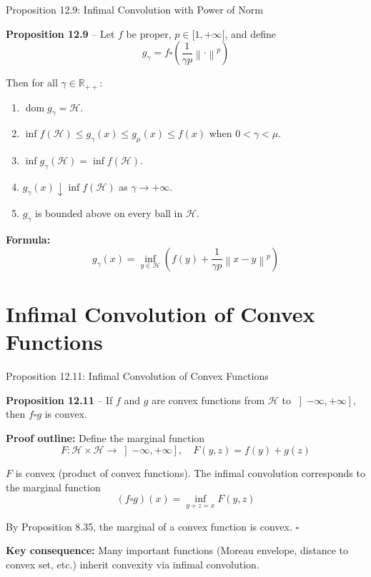 \documentclass[aspectratio=169,10pt]{beamer}
\newcommand{\cH}{\mathcal{H}}
\newcommand{\R}{\mathbb{R}}
\newcommand{\norm}[1]{\left\|#1\right\|}
\newcommand{\dom}{\operatorname{dom}}
\newcommand{\co}{\square}
\begin{document}
\begin{frame}{Proposition 12.9: Infimal Convolution with Power of Norm}

  \textbf{Proposition 12.9} -- Let $f$ be proper, $p \in [1, +\infty[$, and define
  \[
    g_\gamma = f \co \left( \frac{1}{\gamma p} \norm{\cdot}^p \right)
  \]

  Then for all $\gamma \in \R_{++}$:

  \begin{enumerate}
    \item[(i)] $\dom g_\gamma = \cH$.
    \item[(ii)] $\inf f(\cH) \le g_\gamma(x) \le g_\mu(x) \le f(x)$ when $0 < \gamma < \mu$.
    \item[(iii)] $\inf g_\gamma(\cH) = \inf f(\cH)$.
    \item[(iv)] $g_\gamma(x) \downarrow \inf f(\cH)$ as $\gamma \to +\infty$.
    \item[(v)] $g_\gamma$ is bounded above on every ball in $\cH$.
  \end{enumerate}

  \vspace{0.5cm}

  \textbf{Formula:}
  \[
    g_\gamma(x) = \inf_{y \in \cH} \left( f(y) + \frac{1}{\gamma p} \norm{x - y}^p \right)
  \]

\end{frame}

\section{Infimal Convolution of Convex Functions}

\begin{frame}{Proposition 12.11: Infimal Convolution of Convex Functions}

  \textbf{Proposition 12.11} -- If $f$ and $g$ are convex functions from
  $\cH$ to $\left]-\infty, +\infty\right]$, then $f \co g$ is convex.

  \vspace{1cm}

  \textbf{Proof outline:} Define the marginal function
  \[
    F: \cH \times \cH \to \left]-\infty, +\infty\right], \quad F(y,z) = f(y) + g(z)
  \]

  $F$ is convex (product of convex functions). The infimal convolution
  corresponds to the marginal function
  \[
    (f \co g)(x) = \inf_{y+z=x} F(y,z)
  \]

  By Proposition 8.35, the marginal of a convex function is convex. $\square$

  \vspace{1cm}

  \textbf{Key consequence:} Many important functions (Moreau envelope,
  distance to convex set, etc.) inherit convexity via infimal convolution.

\end{frame}
\end{document}
